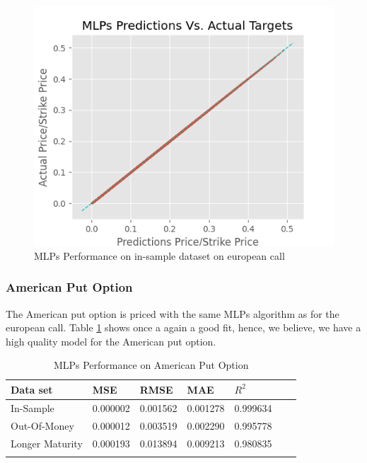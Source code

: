 \begin{figure}[th]
\centering
\includegraphics{Figures/PredictionEuroC.png}
\decoRule
\caption[MLPs Performance on in-sample dataset European Call]{MLPs Performance on in-sample dataset on european call}
\label{fig:MLPsInSampleEuroC}
\end{figure}


\subsubsection{American Put Option}
The American put option is priced with the same MLPs algorithm as for the european call. Table \ref{tab:AmerPerformanceComparision} shows once a again a good fit, hence, we believe, we have a high quality model for the American put option.

\begin{table}[th]
\caption{MLPs Performance on American Put Option}
\label{tab:AmerPerformanceComparision}
\centering
\begin{tabular}{l l l l l l l }
\toprule
\textbf{Data set} & \textbf{MSE} & \textbf{RMSE} & \textbf{MAE} & \textbf{$R^2$} \\
\midrule
In-Sample & 0.000002 & 0.001562 & 0.001278 & 0.999634\\
Out-Of-Money & 0.000012 & 0.003519 & 0.002290 & 0.995778\\
Longer Maturity & 0.000193 & 0.013894 & 0.009213 & 0.980835\\
\bottomrule\\
\end{tabular}
\end{table}


